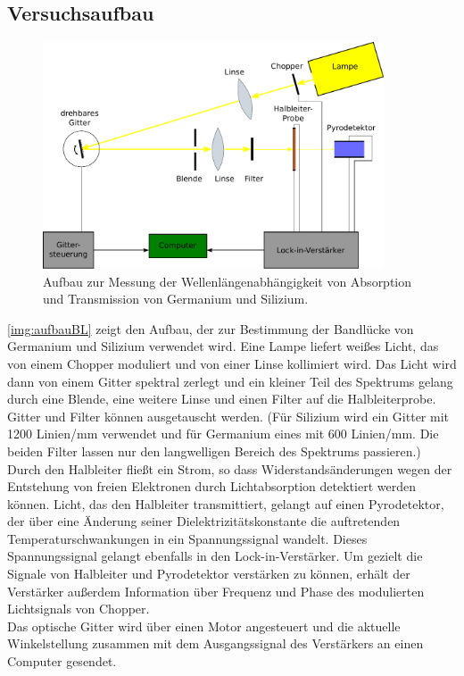 \subsection{Versuchsaufbau}

\begin{figure}[H]
\begin{center}
  \includegraphics[width=0.9\textwidth]{../img/aufbauBL.pdf}
  \caption{Aufbau zur Messung der Wellenlängenabhängigkeit von
  Absorption und Transmission von Germanium und Silizium.}
  \label{img:aufbauBL}
\end{center}
\end{figure}

\autoref{img:aufbauBL} zeigt den Aufbau, der zur Bestimmung der Bandlücke von Germanium und Silizium
verwendet wird.
Eine Lampe liefert weißes Licht,
das von einem Chopper moduliert und von einer Linse kollimiert wird.
Das Licht wird dann von einem Gitter spektral zerlegt und ein kleiner Teil des Spektrums
gelang durch eine Blende, eine weitere Linse und einen Filter auf die Halbleiterprobe.
Gitter und Filter können ausgetauscht werden.
(Für Silizium wird ein Gitter mit 1200 Linien/mm verwendet und für
Germanium eines mit 600 Linien/mm.
Die beiden Filter lassen nur den langwelligen Bereich des Spektrums passieren.)
Durch den Halbleiter fließt ein Strom, so dass Widerstandsänderungen wegen der
Entstehung von freien Elektronen durch Lichtabsorption detektiert werden können.
Licht, das den Halbleiter transmittiert,
gelangt auf einen Pyrodetektor, der über eine Änderung seiner Dielektrizitätskonstante die
auftretenden Temperaturschwankungen in ein Spannungssignal wandelt.
Dieses Spannungssignal gelangt ebenfalls in den Lock-in-Verstärker.
Um gezielt die Signale von Halbleiter und Pyrodetektor verstärken zu können,
erhält der Verstärker außerdem Information über Frequenz und Phase des modulierten Lichtsignals von Chopper.\\
Das optische Gitter wird über einen Motor angesteuert und die aktuelle Winkelstellung
zusammen mit dem Ausgangssignal
des Verstärkers an einen Computer gesendet.


